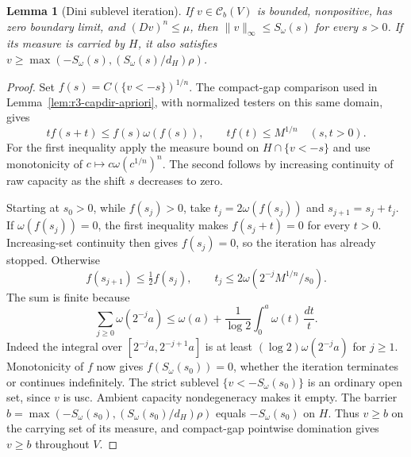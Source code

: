 \documentclass[11pt,a4paper]{article}
\numberwithin{equation}{section}
\newtheorem{lemma}[theorem]{Lemma}
\theoremstyle{definition}
\theoremstyle{remark}
\newcommand{\Cb}{\mathcal C_b}
\begin{document}
\begin{lemma}[Dini sublevel iteration]
\label{lem:r3-dini-sublevel-iteration}
If $v\in\Cb(V)$ is bounded, nonpositive, has zero boundary limit,
and $(Dv)^n\leq\mu$, then $\|v\|_\infty\leq S_\omega(s)$ for
every $s>0$. If its measure is carried by $H$, it also satisfies
$v\geq\max(-S_\omega(s),(S_\omega(s)/d_H)\rho)$.
\end{lemma}

\begin{proof}
Set $f(s)=C(\{v<-s\})^{1/n}$. The compact-gap comparison used in
Lemma~\ref{lem:r3-capdir-apriori}, with normalized testers on this
same domain, gives
\begin{equation}\label{eq:r3-dini-recurrence}
 t f(s+t)\leq f(s)\omega(f(s)),\qquad
 t f(t)\leq M^{1/n}\quad(s,t>0).
\end{equation}
For the first inequality apply the measure bound on
$H\cap\{v<-s\}$ and use monotonicity of
$c\mapsto c\omega(c^{1/n})^n$. The second follows by increasing
continuity of raw capacity as the shift $s$ decreases to zero.

Starting at $s_0>0$, while $f(s_j)>0$, take
$t_j=2\omega(f(s_j))$ and $s_{j+1}=s_j+t_j$. If
$\omega(f(s_j))=0$, the first inequality makes $f(s_j+t)=0$
for every $t>0$. Increasing-set continuity then gives $f(s_j)=0$,
so the iteration has already stopped. Otherwise
\[
 f(s_{j+1})\leq\tfrac12 f(s_j),\qquad
 t_j\leq2\omega(2^{-j}M^{1/n}/s_0).
\]
The sum is finite because
\begin{equation}\label{eq:r3-dini-dyadic-bound}
 \sum_{j\geq0}\omega(2^{-j}a)
 \leq\omega(a)+\frac1{\log2}\int_0^a\omega(t)\,\frac{dt}{t}.
\end{equation}
Indeed the integral over $[2^{-j}a,2^{-j+1}a]$ is at least
$(\log2)\omega(2^{-j}a)$ for $j\geq1$. Monotonicity of $f$
now gives $f(S_\omega(s_0))=0$, whether the iteration terminates
or continues indefinitely. The strict sublevel
$\{v<-S_\omega(s_0)\}$ is an ordinary open set, since $v$ is usc.
Ambient capacity nondegeneracy makes it empty. The barrier
$b=\max(-S_\omega(s_0),(S_\omega(s_0)/d_H)\rho)$ equals
$-S_\omega(s_0)$ on $H$. Thus $v\geq b$ on the carrying set
of its measure, and compact-gap pointwise domination gives
$v\geq b$ throughout $V$.
\end{proof}
\end{document}
